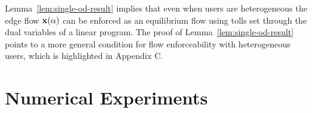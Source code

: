 \documentclass{article}
\newif\ifarxiv   %
\begin{document}
Lemma~\ref{lem:single-od-result} implies that even when users are heterogeneous the edge flow $\mathbf{x}(\alpha)$ %
can be enforced as an equilibrium flow using tolls set through the dual variables of \ifarxiv the capacity constraints of \fi a linear program. \ifarxiv \else The proof of Lemma~\ref{lem:single-od-result} points to a more general condition for flow enforceability with heterogeneous users, which is highlighted in Appendix C.\fi
\ifarxiv
\begin{remark}
We note that in the proof of Lemma~\ref{lem:single-od-result}, all that we required was that the objective function of I-TAP$_{\alpha}$ is monotonically increasing in the flow on each edge of the network. This suggests a more general sufficient condition for enforcing flows as a user equilibrium. In particular, any flow that satisfies the flow conservation constraints and is the solution of a convex program with some convex objective $f(\x)$ that is monotonically increasing in $x_e$ for each $e \in E$ can be induced as a user equilibrium. Note that the I-TAP$_{\alpha}$ objective is a special case of such a function $f(\x)$.
\end{remark}
\fi



\section{Numerical Experiments} \label{sec:numerical-experiments}



\begin{comment}
\begin{figure*}
    \centering
    \begin{subfigure}[t]{0.98\columnwidth}
        \centering
            
    \end{subfigure}
    \begin{subfigure}[t]{0.98\columnwidth}
        \centering
        
    \end{subfigure}
    \vspace{-15pt}
    \caption{{\small \sf Variation in the Inefficiency Ratio (left) and the level of unfairness (right) of the optimal solution $\mathbf{x}(\alpha)$ of I-TAP$_{\alpha}$ with the parameter $\alpha \in [0, 1]$ for six different transportation networks from Table~\ref{tab:problem-instances}. The values of the convex combination parameter were chosen at increments of $0.01$.}%
    } %
    \label{fig:tt_v_alpha_and_beta_v_alpha_finer_discretization}
\end{figure*}
\end{comment}
\end{document}
